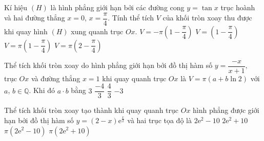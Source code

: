 \begin{ex}%
	Kí hiệu $(H)$ là hình phẳng giới hạn bởi các đường cong $y=\tan x$ trục hoành và hai đường thẳng $x=0$, $x=\dfrac{\pi}{4}$. Tính thể tích $V$ của khối tròn xoay thu được khi quay hình $(H)$ xung quanh trục $Ox$.
	\choice
	{$V=-\pi\left(1-\dfrac{\pi}{4}\right)$}
	{$V=\left(1-\dfrac{\pi}{4}\right)$}
	{\True $V=\pi\left(1-\dfrac{\pi}{4}\right)$}
	{$V=\pi\left(2-\dfrac{\pi}{4}\right)$}
\end{ex}
\begin{ex}%
	Thể tích khối tròn xoay do hình phẳng giới hạn bởi đồ thị hàm số $y=\dfrac{-x}{x+1},$ trục $Ox$ và đường thẳng $x=1$ khi quay quanh trục $Ox$ là $V=\pi (a+b\ln 2)$ với $a$, $b\in\mathbb{Q}$. Khi đó $a\cdot b$ bằng
	\choice
	{$3$}
	{$\dfrac{-4}{3}$}
	{$\dfrac{4}{3}$}
	{\True $-3$}
\end{ex}
\begin{ex}%
	Thể tích khối tròn xoay tạo thành khi quay quanh trục $Ox$ hình phẳng được giới hạn bởi đồ thị hàm số $y=(2-x)\mathrm{e}^{\frac{x}{2}}$ và hai trục tọa độ là
	\choice
	{$2\mathrm{e}^2-10$}
	{$2\mathrm{e}^2+10$}
	{\True $\pi (2\mathrm{e}^2-10)$}
	{$\pi\left(2\mathrm{e}^2+10\right)$}
\end{ex}
